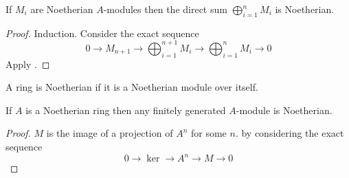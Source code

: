 \begin{prop}
    If $M_i$ are Noetherian $A$-modules then the direct sum 
    $\bigoplus_{i = 1}^n M_i$ is Noetherian.
\end{prop}
\begin{proof}
    Induction. Consider the exact sequence
    \[0 \to M_{n+1} \to \bigoplus_{i = 1}^{n+1} M_i \to 
    \bigoplus_{i = 1}^{n} M_i \to 0\]
    Apply .
\end{proof}

\begin{dfn}
    A ring is Noetherian if it is a Noetherian module over itself.
\end{dfn}

\begin{prop}
    If $A$ is a Noetherian ring then any finitely generated $A$-module is 
    Noetherian.
\end{prop}
\begin{proof}
    $M$ is the image of a projection of $A^n$ for some $n$.
     by considering
    the exact sequence
    \[0 \to \ker \to A^n \to M \to 0\]
\end{proof}

